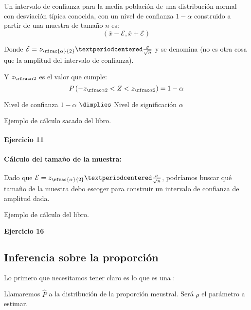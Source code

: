 \begin{theorem}

Un intervalo de confianza para la media población de una distribución normal con desviación típica conocida, con un nivel de confianza $1-\alpha$ construido a partir de una muestra de tamaño $n$ es:
\[\left(\overline{x} - \mathcal{E} , \overline{x} + \mathcal{E}\right)\]



Donde $\mathcal{E} = z_{\rfrac{\alpha}{2}}·\frac{\sigma}{\sqrt{n}}$ y se denomina  (no es otra cosa que la amplitud del intervalo de confianza).

Y $\zalfamedios$ es el valor que cumple:
\[ P\left( -\zalfamedios < Z < \zalfamedios\right) = 1-\alpha\]

\obs Nivel de confianza $1-\alpha$ $\dimplies$ Nivel de significación $\alpha$
\end{theorem}

\begin{example}
Ejemplo de cálculo sacado del libro.
\end{example}

\paragraph{Ejercicio 11}

\paragraph{Cálculo del tamaño de la muestra: } Dado que $\mathcal{E} = z_{\rfrac{\alpha}{2}}·\frac{\sigma}{\sqrt{n}}$, podríamos buscar qué tamaño de la muestra debo escoger para construir un intervalo de confianza de amplitud dada.

\begin{example}
Ejemplo de cálculo del libro.
\end{example}

\textbf{Ejercicio 16}

\subsection{Inferencia sobre la proporción}

Lo primero que necesitamos tener claro es lo que es una :


\newcommand{\matp}{\rho}
Llamaremos $\hat{P}$ a la distribución de la proporción meustral. Será $\matp$ el parámetro a estimar.

